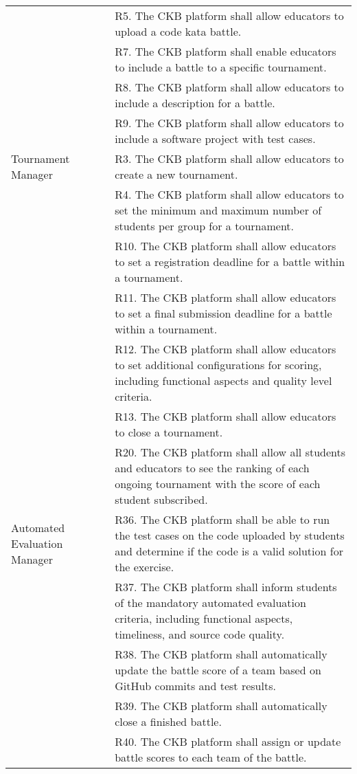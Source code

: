 \begin{center}
\begin{longtable}{p{0.3\linewidth}p{0.7\linewidth}}
        & R5. The CKB platform shall allow educators to upload a code kata battle. \\
        & R7. The CKB platform shall enable educators to include a battle to a specific tournament. \\
        & R8. The CKB platform shall allow educators to include a description for a battle. \\
        & R9. The CKB platform shall allow educators to include a software project with test cases. \\
        \hline
        Tournament Manager & R3. The CKB platform shall allow educators to create a new tournament. \\
        & R4. The CKB platform shall allow educators to set the minimum and maximum number of students per group for a tournament. \\
        & R10. The CKB platform shall allow educators to set a registration deadline for a battle within a tournament. \\
        & R11. The CKB platform shall allow educators to set a final submission deadline for a battle within a tournament. \\
        & R12. The CKB platform shall allow educators to set additional configurations for scoring, including functional aspects and quality level criteria. \\
        & R13. The CKB platform shall allow educators to close a tournament. \\
        & R20. The CKB platform shall allow all students and educators to see the ranking of each ongoing tournament with the score of each student subscribed. \\
        \hline
        Automated Evaluation Manager & R36. The CKB platform shall be able to run the test cases on the code uploaded by students and determine if the code is a valid solution for the exercise. \\
        & R37. The CKB platform shall inform students of the mandatory automated evaluation criteria, including functional aspects, timeliness, and source code quality. \\
        & R38. The CKB platform shall automatically update the battle score of a team based on GitHub commits and test results. \\
        & R39. The CKB platform shall automatically close a finished battle. \\
        & R40. The CKB platform shall assign or update battle scores to each team of the battle. \\

\end{longtable}
\end{center}
